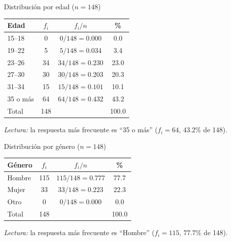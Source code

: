 \begin{mitabla}{Distribución por edad ($n=148$)}
\begin{tabular}{lccc}
\toprule
Edad & $f_i$ & $f_i / n$ & \% \\
\midrule
15–18 & 0 & $0/148 = 0.000$ & 0.0 \\
19–22 & 5 & $5/148 = 0.034$ & 3.4 \\
23–26 & 34 & $34/148 = 0.230$ & 23.0 \\
27–30 & 30 & $30/148 = 0.203$ & 20.3 \\
31–34 & 15 & $15/148 = 0.101$ & 10.1 \\
35 o más & 64 & $64/148 = 0.432$ & 43.2 \\
\midrule
Total & 148 & & 100.0 \\
\bottomrule
\end{tabular}
\end{mitabla}

\textit{Lectura:} la respuesta más frecuente es ``35 o más'' ($f_i = 64$, 43.2\% de 148).

\begin{mitabla}{Distribución por género ($n=148$)}
\begin{tabular}{lccc}
\toprule
Género & $f_i$ & $f_i / n$ & \% \\
\midrule
Hombre & 115 & $115/148 = 0.777$ & 77.7 \\
Mujer & 33 & $33/148 = 0.223$ & 22.3 \\
Otro & 0 & $0/148 = 0.000$ & 0.0 \\
\midrule
Total & 148 & & 100.0 \\
\bottomrule
\end{tabular}
\end{mitabla}

\textit{Lectura:} la respuesta más frecuente es ``Hombre'' ($f_i = 115$, 77.7\% de 148).

